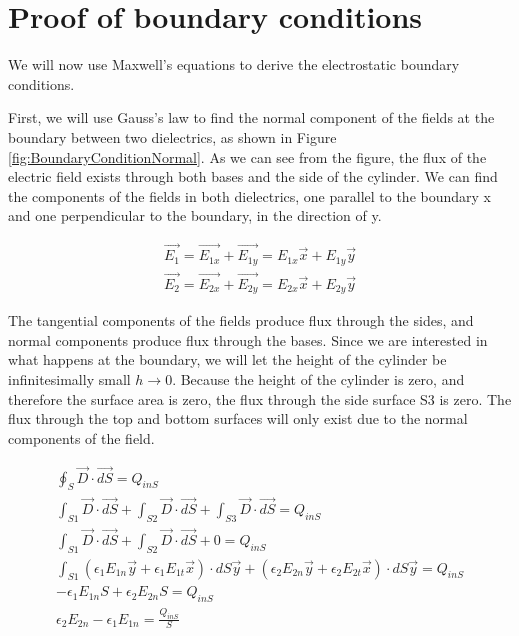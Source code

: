 \documentclass{ximera}
\begin{document}
\section{Proof of boundary conditions}

We will now use Maxwell's equations to derive the electrostatic boundary conditions. 

First, we will use Gauss's law to find the normal component of the fields at the boundary between two dielectrics, as shown in Figure \ref{fig:BoundaryConditionNormal}. As we can see from the figure, the flux of the electric field exists through both bases and the side of the cylinder. We can find the components of the fields in both dielectrics, one parallel to the boundary x and one perpendicular to the boundary, in the direction of y.

\begin{eqnarray}
\vec{E_1}= \vec{E_{1x}}+\vec{E_{1y}}= E_{1x} \vec{x}+E_{1y} \vec{y} \\
\vec{E_2}= \vec{E_{2x}}+\vec{E_{2y}}= E_{2x} \vec{x}+E_{2y} \vec{y}
\end{eqnarray}


The tangential components of the fields produce flux through the sides, and normal components produce flux through the bases.  Since we are interested in what happens at the boundary, we will let the height of the cylinder be infinitesimally small $h \rightarrow 0$. Because the height of the cylinder is zero, and therefore the surface area is zero, the flux through the side surface S3 is zero. The flux through the top and bottom surfaces will only exist due to the normal components of the field.

\begin{eqnarray}
\oint_S \vec{D} \cdot \vec{dS} = Q_{inS} \\
\int_{S1} \vec{D} \cdot \vec{dS}  +\int_{S2} \vec{D} \cdot \vec{dS}+\int_{S3} \vec{D} \cdot \vec{dS}  =  Q_{inS} \\
\int_{S1} \vec{D} \cdot \vec{dS}  +\int_{S2} \vec{D} \cdot \vec{dS} +0 = Q_{inS} \\
\int_{S1} (\epsilon_1 E_{1n}\vec{y}+\epsilon_1 E_{1t}\vec{x}) \cdot dS\vec{y}  +(\epsilon_2 E_{2n}\vec{y}+\epsilon_2 E_{2t}\vec{x}) \cdot dS\vec{y} = Q_{inS}\\
-\epsilon_{1} E_{1n} S + \epsilon_2 E_{2n} S = Q_{inS}  \\
\epsilon_2 E_{2n} -\epsilon_{1} E_{1n}= \frac{Q_{inS}}{S} 
\end{eqnarray}
\end{document}
